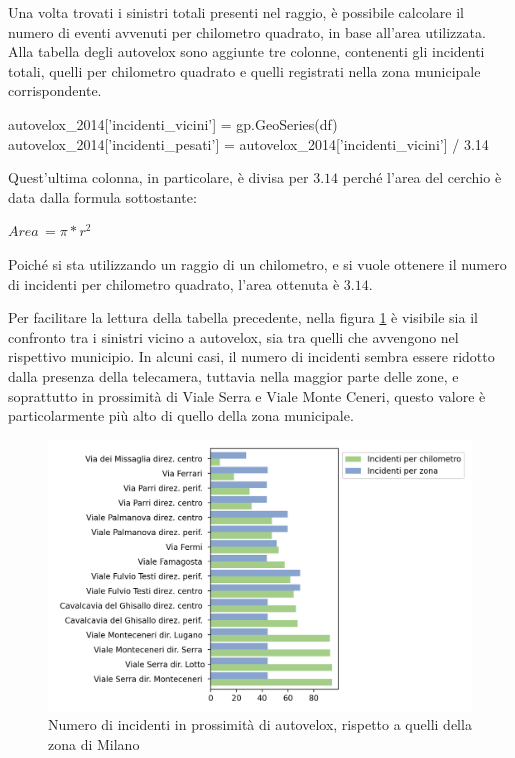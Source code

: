 \documentclass[a4paper]{report}
\begin{document}

Una volta trovati i sinistri totali presenti nel raggio, 
è possibile calcolare il numero di eventi avvenuti per chilometro quadrato, 
in base all'area utilizzata. 
Alla tabella degli autovelox sono aggiunte tre colonne, contenenti gli incidenti totali, 
quelli per chilometro quadrato e quelli registrati nella zona municipale corrispondente. 

\begin{code}
autovelox_2014['incidenti_vicini'] = gp.GeoSeries(df)
autovelox_2014['incidenti_pesati'] = autovelox_2014['incidenti_vicini'] / 3.14
\end{code}

Quest'ultima colonna, in particolare, è divisa per $3.14$ perché l'area del cerchio 
è data dalla formula sottostante: 

\begin{center}
    $Area\, = \pi * r^2$
\end{center}

Poiché si sta utilizzando un raggio di un chilometro, e si vuole ottenere il 
numero di incidenti per chilometro quadrato, l'area ottenuta è $3.14$. 

Per facilitare la lettura della tabella precedente, nella figura \ref{fig:confronto-autovelox} 
è visibile sia il confronto tra i sinistri vicino a autovelox, 
sia tra quelli che avvengono nel rispettivo municipio. 
In alcuni casi, il numero di incidenti sembra essere ridotto dalla presenza 
della telecamera,  
tuttavia nella maggior parte delle zone, e soprattutto in prossimità di Viale Serra e 
Viale Monte Ceneri, questo valore è particolarmente più alto di 
quello della zona municipale. 

\begin{figure}
    \includegraphics[width=\linewidth]{../src/autovelox/conclusioni_autovelox.png}
    \caption{Numero di incidenti in prossimità di autovelox, rispetto a quelli 
    della zona di Milano}
    \label{fig:confronto-autovelox}
\end{figure}
\end{document}
